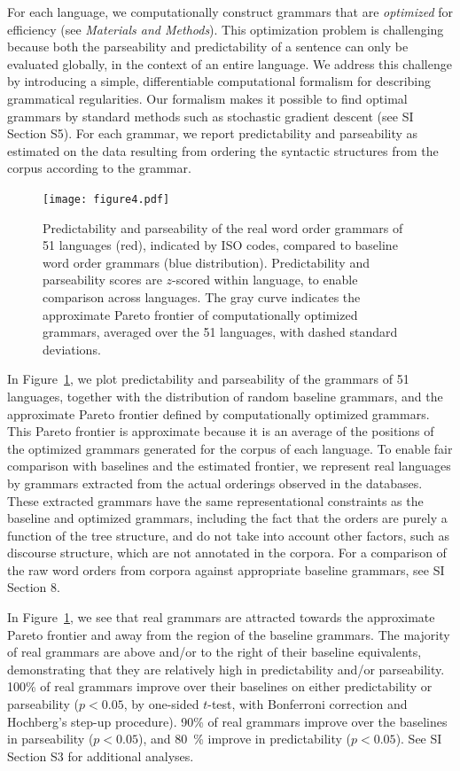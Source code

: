\documentclass[9pt,twocolumn,twoside,lineno]{pnas-new}
\begin{document}
For each language, we computationally construct grammars that are \emph{optimized} for efficiency (see \textit{Materials and Methods}).
This optimization problem is challenging because both the parseability and predictability of a sentence can only be evaluated globally, in the context of an entire language.
We address this challenge by introducing a simple, differentiable computational formalism for describing grammatical regularities. 
Our formalism makes it possible to find optimal grammars by standard methods such as stochastic gradient descent (see SI Section S5).
For each grammar, we report predictability and parseability as estimated on the data resulting from ordering the syntactic structures from the corpus according to the grammar.


\begin{figure}
    \centering
    \texttt{[image: figure4.pdf]}
    \caption{Predictability and parseability of the real word order grammars of 51 languages (red), indicated by ISO codes, compared to baseline word order grammars (blue distribution). Predictability and parseability scores are $z$-scored within language, to enable comparison across languages. The gray curve indicates the approximate Pareto frontier of computationally optimized grammars, averaged over the 51 languages, with dashed standard deviations.} 
    \label{fig:pareto-plane}
\end{figure}

In Figure~\ref{fig:pareto-plane}, we plot predictability and parseability of the grammars of 51 languages, together with the distribution of random baseline grammars, and the approximate Pareto frontier defined by computationally optimized grammars.
This Pareto frontier is approximate because it is an average of the positions of the optimized grammars generated for the corpus of each language.
To enable fair comparison with baselines and the estimated frontier, we represent real languages by grammars extracted from the actual orderings observed in the databases. 
These extracted grammars have the same representational constraints as the baseline and optimized grammars,
including the fact that the orders are purely a function of the tree structure, and do not take into account other factors, such as discourse structure, which are not annotated in the corpora.
For a comparison of the raw word orders from corpora against appropriate baseline grammars, see SI Section 8.

In Figure~\ref{fig:pareto-plane}, we see that real grammars are attracted towards the approximate Pareto frontier and away from the region of the baseline grammars.
The majority of real grammars are above and/or to the right of their baseline equivalents, demonstrating that they are relatively high in predictability and/or parseability.
100\% of real grammars improve over their baselines on either predictability or parseability ($p<0.05$, by one-sided $t$-test, with Bonferroni correction and Hochberg's step-up procedure).  %
90\% of real grammars improve over the baselines in parseability ($p < 0.05$), and 80~\% improve in predictability ($p < 0.05$).
See SI Section S3 for additional analyses.
\end{document}
